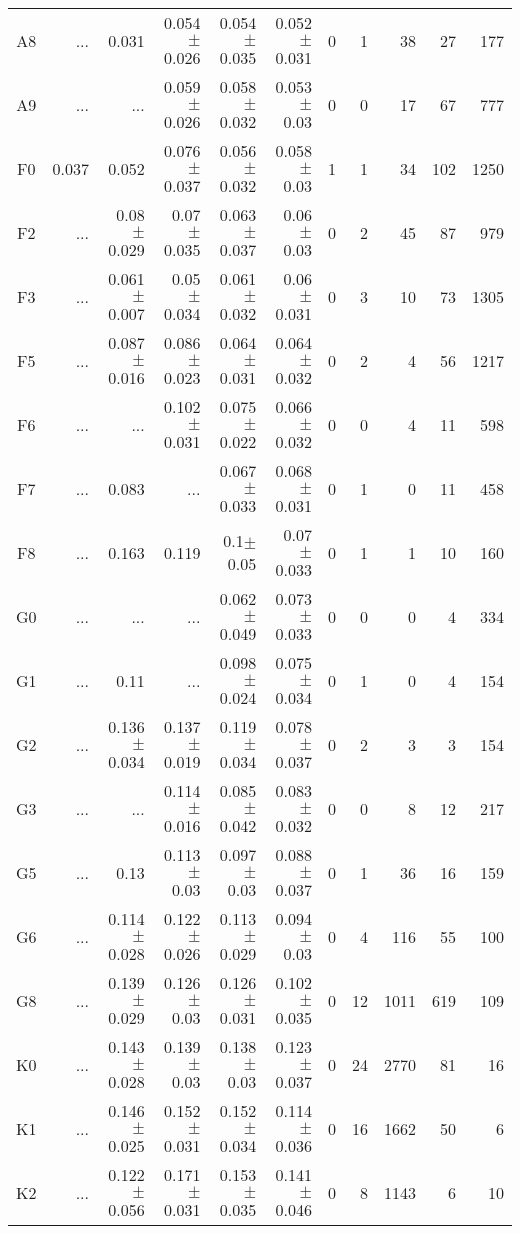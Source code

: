 \begin{table}[t]
\begin{table}[t]
\begin{center}
\begin{tabular}{c|rrrrr|rrrrr}
    A8	&	 ...	&	0.031	&	0.054$\pm$0.026	&	0.054$\pm$0.035	&	0.052$\pm$0.031	&	0	&	1	&	38	&	27	&	177	\\
    A9	&	 ...	&	 ...	&	0.059$\pm$0.026	&	0.058$\pm$0.032	&	0.053$\pm$0.03	&	0	&	0	&	17	&	67	&	777	\\
    F0	&	0.037	&	0.052	&	0.076$\pm$0.037	&	0.056$\pm$0.032	&	0.058$\pm$0.03	&	1	&	1	&	34	&	102	&	1250	\\
    F2	&	 ...	&	0.08$\pm$0.029	&	0.07$\pm$0.035	&	0.063$\pm$0.037	&	0.06$\pm$0.03	&	0	&	2	&	45	&	87	&	979	\\
    F3	&	 ...	&	0.061$\pm$0.007	&	0.05$\pm$0.034	&	0.061$\pm$0.032	&	0.06$\pm$0.031	&	0	&	3	&	10	&	73	&	1305	\\
    F5	&	 ...	&	0.087$\pm$0.016	&	0.086$\pm$0.023	&	0.064$\pm$0.031	&	0.064$\pm$0.032	&	0	&	2	&	4	&	56	&	1217	\\
    F6	&	 ...	&	 ...	&	0.102$\pm$0.031	&	0.075$\pm$0.022	&	0.066$\pm$0.032	&	0	&	0	&	4	&	11	&	598	\\
    F7	&	 ...	&	0.083	&	 ...	&	0.067$\pm$0.033	&	0.068$\pm$0.031	&	0	&	1	&	0	&	11	&	458	\\
    F8	&	 ...	&	0.163	&	0.119	&	0.1$\pm$0.05	&	0.07$\pm$0.033	&	0	&	1	&	1	&	10	&	160	\\
    G0	&	 ...	&	 ...	&	 ...	&	0.062$\pm$0.049	&	0.073$\pm$0.033	&	0	&	0	&	0	&	4	&	334	\\
    G1	&	 ...	&	0.11	&	 ...	&	0.098$\pm$0.024	&	0.075$\pm$0.034	&	0	&	1	&	0	&	4	&	154	\\
    G2	&	 ...	&	0.136$\pm$0.034	&	0.137$\pm$0.019	&	0.119$\pm$0.034	&	0.078$\pm$0.037	&	0	&	2	&	3	&	3	&	154	\\
    G3	&	 ...	&	 ...	&	0.114$\pm$0.016	&	0.085$\pm$0.042	&	0.083$\pm$0.032	&	0	&	0	&	8	&	12	&	217	\\
    G5	&	 ...	&	0.13	&	0.113$\pm$0.03	&	0.097$\pm$0.03	&	0.088$\pm$0.037	&	0	&	1	&	36	&	16	&	159	\\
    G6	&	 ...	&	0.114$\pm$0.028	&	0.122$\pm$0.026	&	0.113$\pm$0.029	&	0.094$\pm$0.03	&	0	&	4	&	116	&	55	&	100	\\
    G8	&	 ...	&	0.139$\pm$0.029	&	0.126$\pm$0.03	&	0.126$\pm$0.031	&	0.102$\pm$0.035	&	0	&	12	&	1011	&	619	&	109	\\
    K0	&	 ...	&	0.143$\pm$0.028	&	0.139$\pm$0.03	&	0.138$\pm$0.03	&	0.123$\pm$0.037	&	0	&	24	&	2770	&	81	&	16	\\
    K1	&	 ...	&	0.146$\pm$0.025	&	0.152$\pm$0.031	&	0.152$\pm$0.034	&	0.114$\pm$0.036	&	0	&	16	&	1662	&	50	&	6	\\
    K2	&	 ...	&	0.122$\pm$0.056	&	0.171$\pm$0.031	&	0.153$\pm$0.035	&	0.141$\pm$0.046	&	0	&	8	&	1143	&	6	&	10	\\

\end{tabular}
\end{center}
\end{table}
\end{table}
